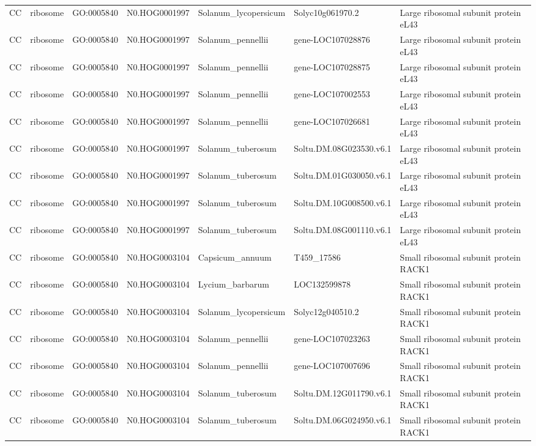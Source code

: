 \begin{table}
\begin{tabular}[t]{lllllll}
CC & ribosome & GO:0005840 & N0.HOG0001997 & Solanum\_lycopersicum & Solyc10g061970.2 & Large ribosomal subunit protein eL43\\
CC & ribosome & GO:0005840 & N0.HOG0001997 & Solanum\_pennellii & gene-LOC107028876 & Large ribosomal subunit protein eL43\\
CC & ribosome & GO:0005840 & N0.HOG0001997 & Solanum\_pennellii & gene-LOC107028875 & Large ribosomal subunit protein eL43\\
CC & ribosome & GO:0005840 & N0.HOG0001997 & Solanum\_pennellii & gene-LOC107002553 & Large ribosomal subunit protein eL43\\
CC & ribosome & GO:0005840 & N0.HOG0001997 & Solanum\_pennellii & gene-LOC107026681 & Large ribosomal subunit protein eL43\\
CC & ribosome & GO:0005840 & N0.HOG0001997 & Solanum\_tuberosum & Soltu.DM.08G023530.v6.1 & Large ribosomal subunit protein eL43\\
CC & ribosome & GO:0005840 & N0.HOG0001997 & Solanum\_tuberosum & Soltu.DM.01G030050.v6.1 & Large ribosomal subunit protein eL43\\
CC & ribosome & GO:0005840 & N0.HOG0001997 & Solanum\_tuberosum & Soltu.DM.10G008500.v6.1 & Large ribosomal subunit protein eL43\\
CC & ribosome & GO:0005840 & N0.HOG0001997 & Solanum\_tuberosum & Soltu.DM.08G001110.v6.1 & Large ribosomal subunit protein eL43\\
CC & ribosome & GO:0005840 & N0.HOG0003104 & Capsicum\_annuum & T459\_17586 & Small ribosomal subunit protein RACK1\\
CC & ribosome & GO:0005840 & N0.HOG0003104 & Lycium\_barbarum & LOC132599878 & Small ribosomal subunit protein RACK1\\
CC & ribosome & GO:0005840 & N0.HOG0003104 & Solanum\_lycopersicum & Solyc12g040510.2 & Small ribosomal subunit protein RACK1\\
CC & ribosome & GO:0005840 & N0.HOG0003104 & Solanum\_pennellii & gene-LOC107023263 & Small ribosomal subunit protein RACK1\\
CC & ribosome & GO:0005840 & N0.HOG0003104 & Solanum\_pennellii & gene-LOC107007696 & Small ribosomal subunit protein RACK1\\
CC & ribosome & GO:0005840 & N0.HOG0003104 & Solanum\_tuberosum & Soltu.DM.12G011790.v6.1 & Small ribosomal subunit protein RACK1\\
CC & ribosome & GO:0005840 & N0.HOG0003104 & Solanum\_tuberosum & Soltu.DM.06G024950.v6.1 & Small ribosomal subunit protein RACK1\\

\end{tabular}
\end{table}
